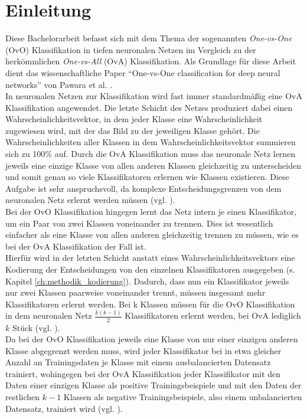 \chapter{Einleitung}
\label{ch:einleitung}



Diese Bachelorarbeit befasst sich mit dem Thema der sogenannten \textit{One-vs-One} (OvO) Klassifikation in tiefen neuronalen Netzen im Vergleich zu der herkömmlichen \textit{One-vs-All} (OvA) Klassifikation. Als Grundlage für diese Arbeit dient das wissenschaftliche Paper \enquote{One-vs-One classification for deep neural networks} von Pawara et al. \cite{pawaraPaper}.\\

In neuronalen Netzen zur Klassifikation wird fast immer standardmäßig eine OvA Klassifikation angewendet. Die letzte Schicht des Netzes produziert dabei einen Wahrscheinlichkeitsvektor, in dem jeder Klasse eine Wahrscheinlichkeit zugewiesen wird, mit der das Bild zu der jeweiligen Klasse gehört. Die Wahrscheinlichkeiten aller Klassen in dem Wahrscheinlichkeitsvektor summieren sich zu 100\% auf. Durch die OvA Klassifikation muss das neuronale Netz lernen jeweils eine einzige Klasse von allen anderen Klassen gleichzeitig zu unterscheiden und somit genau so viele Klassifikatoren erlernen wie Klassen existieren. Diese Aufgabe ist sehr anspruchsvoll, da komplexe Entscheidungsgrenzen von dem neuronalen Netz erlernt werden müssen (vgl. \cite{pawaraPaper}).\\

Bei der OvO Klassifikation hingegen lernt das Netz intern je einen Klassifikator, um ein Paar von zwei Klassen voneinander zu trennen. Dies ist wesentlich einfacher als eine Klasse von allen anderen gleichzeitig trennen zu müssen, wie es bei der OvA Klassifikation der Fall ist.\\

Hierfür wird in der letzten Schicht anstatt eines Wahrscheinlichkeitsvektors eine Kodierung der Entscheidungen von den einzelnen Klassifikatoren ausgegeben (s. Kapitel \ref{ch:methodik_kodierung}).
Dadurch, dass nun ein Klassifikator jeweils nur zwei Klassen paarweise voneinander trennt, müssen insgesamt mehr Klassifikatoren erlernt werden.
Bei k Klassen müssen für die OvO Klassifikation in dem neuronalen Netz $\frac{k(k-1)}{2}$ Klassifikatoren erlernt werden, bei OvA lediglich $k$ Stück (vgl. \cite{pawaraPaper}).\\

Da bei der OvO Klassifikation jeweils eine Klasse von nur einer einzigen anderen Klasse abgegrenzt werden muss, wird jeder Klassifikator bei in etwa gleicher Anzahl an Trainingsdaten je Klasse mit einem ausbalancierten Datensatz trainiert, wohingegen bei der OvA Klassifikation jeder Klassifikator mit den Daten einer einzigen Klasse als positive Trainingsbeispiele und mit den Daten der restlichen $k-1$ Klassen als negative Trainingsbeispiele, also einem unbalancierten Datensatz, trainiert wird (vgl. \cite{pawaraPaper}).\\

